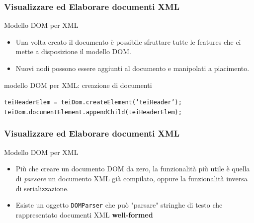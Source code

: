 \begin{frame}
    \frametitle{Visualizzare ed Elaborare documenti XML}
    \addtocounter{nframe}{1}

     \begin{block}{Modello DOM per XML}
        \begin{itemize}
            \item Una volta creato il documento è possibile sfruttare tutte le features che ci mette a disposizione il modello DOM.
            \item Nuovi nodi possono essere aggiunti al documento e manipolati a piacimento.
        \end{itemize}
        
     \end{block}

     \begin{block}{modello DOM per XML: creazione di documenti}
       
       \texttt{teiHeaderElem = teiDom.createElement('teiHeader'); }
       \\\texttt{teiDom.documentElement.appendChild(teiHeaderElem);}
       
     \end{block}
     
\end{frame}

\begin{frame}
    \frametitle{Visualizzare ed Elaborare documenti XML}
    \addtocounter{nframe}{1}

     \begin{block}{Modello DOM per XML}
        \begin{itemize}
            \item  Più che creare un documento DOM da zero, la funzionalità più utile è quella di \textit{parsare} un documento XML già compilato, oppure la funzionalità inversa di serializzazione.
            \item Esiste un oggetto  \texttt{DOMParser} che può "parsare" stringhe di testo che rappresentato documenti XML \textbf{well-formed}
        \end{itemize}
        
     \end{block}
     
\end{frame}

